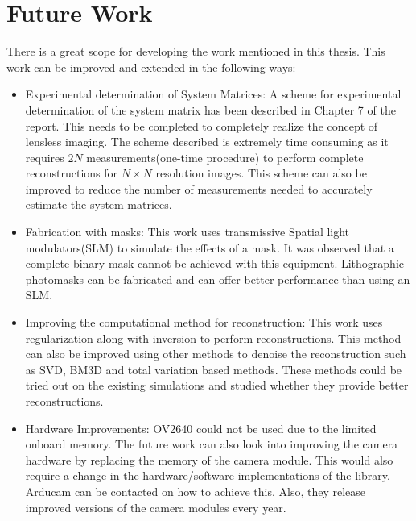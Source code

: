 \section{Future Work}
There is a great scope for developing the work mentioned in this thesis. This work can be improved and extended in the following ways:
\begin{itemize}
\item Experimental determination of System Matrices: A scheme for experimental determination of the system matrix has been described in Chapter 7 of the report. This needs to be completed to completely realize the concept of lensless imaging. The scheme described is extremely time consuming as it requires $2N$ measurements(one-time procedure) to perform complete reconstructions for $N \times N$ resolution images. This scheme can also be improved to reduce the number of measurements needed to accurately estimate the system matrices. 

\item Fabrication with masks: This work uses transmissive Spatial light modulators(SLM) to simulate the effects of a mask. It was observed that a complete binary mask cannot be achieved with this equipment. Lithographic photomasks can be fabricated and can offer better performance than using an SLM.

\item Improving the computational method for reconstruction: This work uses regularization along with inversion to perform reconstructions. This method can also be improved using other methods to denoise the reconstruction such as SVD, BM3D and total variation based methods\cite{Flatcam}. These methods could be tried out on the existing simulations and studied whether they provide better reconstructions.

\item Hardware Improvements: OV2640 could not be used due to the limited onboard memory. The future work can also look into improving the camera hardware by replacing the memory of the camera module. This would also require a change in the hardware/software implementations of the library. Arducam can be contacted on how to achieve this. Also, they release improved versions of the camera modules every year.
\end{itemize}

